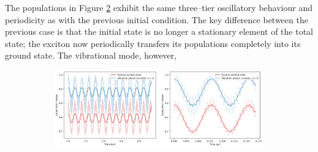 \documentclass[11pt]{article}
\begin{document}
The populations in Figure \ref{fig:EVM_CQS_Pop_eg} exhibit the same three--tier oscillatory behaviour and periodicity as with the previous initial condition. The key difference between the previous case is that the initial state is no longer a stationary element of the total state; the exciton now periodically transfers its populations completely into its ground state. The vibrational mode, however, 
\newpage
\begin{figure}[H]
    \centering

    \begin{subfigure}{\textwidth}
        \centering
        \includegraphics[width=0.49\textwidth]{Research Project/Code/results/ExVib/Closed/Envelope/pops_excited_eg.png}
        \hfill
        \includegraphics[width=0.49\textwidth]{Research Project/Code/results/ExVib/Closed/Fast/pops_excited_eg.png}
        \caption{}
        \label{fig:EVM_CQS_Pop_eg}
    \end{subfigure}

    \vspace{0.8em}


\end{figure}
\end{document}
